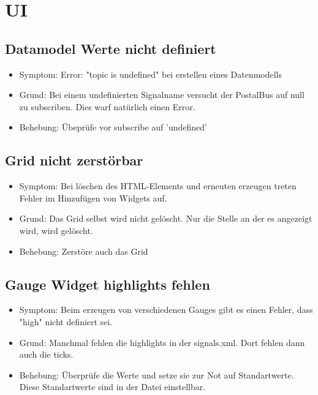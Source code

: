 \documentclass[qualitaetssicherung.tex]{subfiles}
\begin{document}
\section{UI}

	\subsection{Datamodel Werte nicht definiert}
		\begin{itemize}
			\item
			Symptom: Error: "topic is undefined" bei erstellen eines Datenmodells
			\item
			Grund: Bei einem undefinierten Signalname versucht der PostalBus auf null zu subscriben. Dies warf natürlich einen Error.
			\item
			Behebung: Übeprüfe vor subscribe auf 'undefined'
		\end{itemize}
		
	\subsection{Grid nicht zerstörbar}
		\begin{itemize}
			\item
			Symptom: Bei löschen des HTML-Elements und erneuten erzeugen treten Fehler im Hinzufügen von Widgets auf. 
			\item
			Grund: Das Grid selbst wird nicht gelöscht. Nur die Stelle an der es angezeigt wird, wird gelöscht.
			\item
			Behebung: Zerstöre auch das Grid
		\end{itemize}
		
	\subsection{Gauge Widget highlights fehlen}
	\begin{itemize}
		\item
		Symptom: Beim erzeugen von verschiedenen Gauges gibt es einen Fehler, dass "high" nicht definiert sei.
		\item
		Grund: Manchmal fehlen die highlights in der signals.xml. Dort fehlen dann auch die ticks.
		\item
		Behebung: Überprüfe die Werte und setze sie zur Not auf Standartwerte. Diese Standartwerte sind in der Datei einstellbar.
	\end{itemize}	
\end{document}
